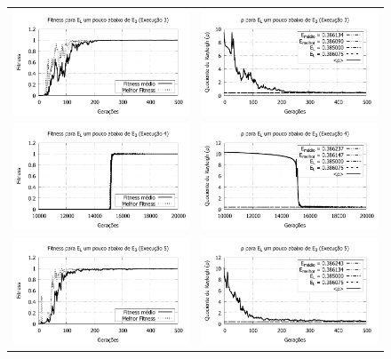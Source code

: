 \begin{figure}[htbp]
\begin{tabular}{@{}cc@{}}
		\includegraphics[width=.49\textwidth]{figs/resultados/variandoEL/T2E3_fitness.pdf} &
    \includegraphics[width=.49\textwidth]{figs/resultados/variandoEL/T2E3_rho.pdf}   \\
		
		\includegraphics[width=.49\textwidth]{figs/resultados/variandoEL/T2E4_fitness-extendido.pdf} &
    \includegraphics[width=.49\textwidth]{figs/resultados/variandoEL/T2E4_rho_extendido.pdf}   \\
		
		\includegraphics[width=.49\textwidth]{figs/resultados/variandoEL/T2E5_fitness.pdf} &
    \includegraphics[width=.49\textwidth]{figs/resultados/variandoEL/T2E5_rho.pdf}
		

\end{tabular}
\end{figure}
